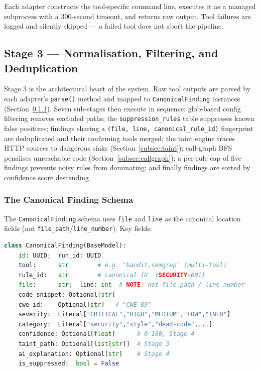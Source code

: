 Each adapter constructs the tool-specific command line, executes it as a managed subprocess with a 300-second timeout, and returns raw output. Tool failures are logged and silently skipped — a failed tool does not abort the pipeline.

\subsection{Stage 3 — Normalisation, Filtering, and Deduplication}

Stage 3 is the architectural heart of the system. Raw tool outputs are parsed by each adapter's \texttt{parse()} method and mapped to \texttt{CanonicalFinding} instances (Section~\ref{subsec:schema}). Seven sub-stages then execute in sequence: glob-based config filtering removes excluded paths; the \texttt{suppression\_rules} table suppresses known false positives; findings sharing a \texttt{(file, line, canonical\_rule\_id)} fingerprint are deduplicated and their confirming tools merged; the taint engine traces HTTP sources to dangerous sinks (Section~\ref{subsec:taint}); call-graph BFS penalises unreachable code (Section~\ref{subsec:callgraph}); a per-rule cap of five findings prevents noisy rules from dominating; and finally findings are sorted by confidence score descending.

\subsubsection{The Canonical Finding Schema}
\label{subsec:schema}

The \texttt{CanonicalFinding} schema uses \texttt{file} and \texttt{line} as the canonical location fields (not \texttt{file\_path}/\texttt{line\_number}). Key fields:

\begin{lstlisting}[language=Python, caption={Canonical Finding Schema (Pydantic v2, key fields)}, label={lst:finding_schema}]
class CanonicalFinding(BaseModel):
    id: UUID;  run_id: UUID
    tool:      str        # e.g. "bandit,semgrep" (multi-tool)
    rule_id:   str        # canonical ID  (SECURITY-001)
    file:      str;  line: int  # NOTE: not file_path / line_number
    code_snippet: Optional[str]
    cwe_id:    Optional[str]   # "CWE-89"
    severity:  Literal["CRITICAL","HIGH","MEDIUM","LOW","INFO"]
    category:  Literal["security","style","dead-code",...]
    confidence: Optional[float]      # 0-100, Stage 4
    taint_path: Optional[list[str]]  # Stage 3
    ai_explanation: Optional[str]    # Stage 4
    is_suppressed:  bool = False
\end{lstlisting}

